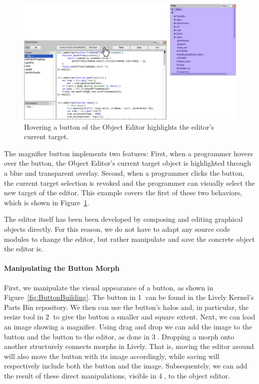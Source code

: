 \begin{figure}[h]
    \centering
    \includegraphics[width=\textwidth]{figures/3_motivation/2_magnifierBehavior.png}
    \caption{Hovering a button of the Object Editor highlights the editor's current target.}
    \label{fig:MagnifierBehavior}
\end{figure}

The magnifier button implements two features: First, when a programmer hovers over the button, the Object Editor's current target object is highlighted through a blue and transparent overlay. Second, when a programmer clicks the button, the current target selection is revoked and the programmer can visually select the new target of the editor.
This example covers the first of these two behaviors, which is shown in Figure~\ref{fig:MagnifierBehavior}.

The editor itself has been been developed by composing and editing graphical objects directly.
For this reason, we do not have to adapt any source code modules to change the editor, but rather manipulate and save the concrete object the editor is.

\paragraph{Manipulating the Button Morph}
First, we manipulate the visual appearance of a button, as shown in Figure~\ref{fig:ButtonBuilding}.
The button in \textcircled{1} can be found in the Lively Kernel's Parts Bin repository.
We then can use the button's halos and, in particular, the resize tool in \textcircled{2} to give the button a smaller and square extent.
Next, we can load an image showing a magnifier.
Using drag and drop we can add the image to the button and the button to the editor, as done in \textcircled{3}.
Dropping a morph onto another structurely connects morphs in Lively.
That is, moving the editor around will also move the button with its image accordingly, while saving will respectively include both the button and the image.
Subsequentely, we can add the result of these direct manipulations, visible in \textcircled{4}, to the object editor.

